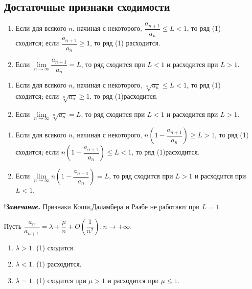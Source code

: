 \documentclass[a4paper,12pt]{scrartcl}
\begin{document}
\subsection{Достаточные признаки сходимости}
\begin{description}
\item[Признак Даламбера.]
\begin{enumerate}
\item Если для всякого $n$, начиная с некоторого, $\dfrac{a_{n+1}}{a_n} \leqslant L < 1$, то ряд (1) сходится; если $\dfrac{a_{n+1}}{a_n} \geqslant 1$, то ряд (1) расходится.
\item Если $\lim\limits_{n\to\infty}\dfrac{a_{n+1}}{a_n} = L$, то ряд сходится при $L<1$  и расходится при $L>1$.
\end{enumerate}
\item[Признак Коши.]
\begin{enumerate}
\item Если для всякого $n$, начиная с некоторого, $\sqrt[n]{a_n} \leqslant L< 1$, то ряд (1) сходится; если $\sqrt[n]{a_n} \geqslant 1$, то ряд (1)расходится.
\item Если $\lim\limits_{n\to\infty}\sqrt[n]{a_n} = L$, то ряд сходится при $L<1$  и расходится при $L>1$.
\end{enumerate}
\item[Признак Раабе.]
\begin{enumerate}
\item Если для всякого $n$, начиная с некоторого, $n\left( 1 - \dfrac{a_{n+1}}{a_n}\right) \geqslant L > 1$, то ряд (1) сходится; если $n\left( 1 - \dfrac{a_{n+1}}{a_n}\right) \leqslant L < 1$, то ряд (1)расходится.
\item Если $\lim\limits_{n\to\infty}n\left( 1 - \dfrac{a_{n+1}}{a_n}\right) = L$, то ряд сходится при $L>1$  и расходится при $L<1$.
\end{enumerate}


\item{!\bfseries\emph{Замечание}.} Признаки Коши,Даламбера и Раабе не работают при $L=1$.

\item[Признак Гаусса.] Пусть $\dfrac{a_n}{a_{n+1}} = \lambda + \dfrac{\mu}{n} + O\left(\dfrac{1}{n^2}\right),n\to+\infty$.
\begin{enumerate}
 \item $ \lambda > 1$. (1) сходится.
 \item $ \lambda < 1$. (1) расходится.
 \item $ \lambda = 1$. (1) сходится при $\mu > 1$ и расходится при $\mu \leqslant 1$.
\end{enumerate}


\end{description}
\end{document}
